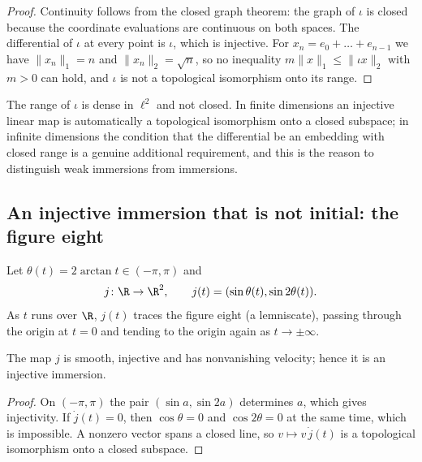 \begin{proof}
  \leanok
  Continuity follows from the closed graph theorem: the graph of $\iota$ is closed because the
  coordinate evaluations are continuous on both spaces. The differential of $\iota$ at every
  point is $\iota$, which is injective. For $x_n = e_0 + \dots + e_{n-1}$ we have
  $\|x_n\|_1 = n$ and $\|x_n\|_2 = \sqrt n$, so no inequality $m\|x\|_1 \le \|\iota x\|_2$ with
  $m > 0$ can hold, and $\iota$ is not a topological isomorphism onto its range.
\end{proof}

\begin{remark}
  The range of $\iota$ is dense in $\ell^2$ and not closed. In finite dimensions an injective
  linear map is automatically a topological isomorphism onto a closed subspace; in infinite
  dimensions the condition that the differential be an embedding with closed range is a genuine
  additional requirement, and this is the reason to distinguish weak immersions from
  immersions.
\end{remark}

\subsection{An injective immersion that is not initial: the figure eight}

Let $\theta(t) = 2\arctan t \in (-\pi, \pi)$ and
\[
  j \colon \R \to \R^2, \qquad j(t) = (\sin\theta(t), \sin 2\theta(t)).
\]
As $t$ runs over $\R$, $j(t)$ traces the figure eight (a lemniscate), passing through the origin
at $t = 0$ and tending to the origin again as $t \to \pm\infty$.

\begin{proposition}
  \label{prop:ex-lemniscate-immersed}
  \leanok
  The map $j$ is smooth, injective and has nonvanishing velocity; hence it is an injective
  immersion.
\end{proposition}

\begin{proof}
  \leanok
  On $(-\pi, \pi)$ the pair $(\sin a, \sin 2a)$ determines $a$, which gives injectivity. If
  $\dot j(t) = 0$, then $\cos\theta = 0$ and $\cos 2\theta = 0$ at the same time, which is
  impossible. A nonzero vector spans a closed line, so $v \mapsto v\,\dot j(t)$ is a
  topological isomorphism onto a closed subspace.
\end{proof}


